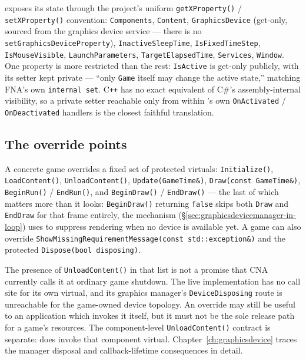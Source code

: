  exposes its state through the project's uniform
\texttt{getXProperty()} / \texttt{setXProperty()} convention: \texttt{Components},
\texttt{Content}, \texttt{GraphicsDevice} (get-only, sourced from the graphics device
service --- there is no \texttt{setGraphicsDeviceProperty}), \texttt{InactiveSleepTime},
\texttt{IsFixedTimeStep}, \texttt{IsMouseVisible}, \texttt{LaunchParameters},
\texttt{TargetElapsedTime}, \texttt{Services}, \texttt{Window}. One property is more
restricted than the rest: \texttt{IsActive} is get-only publicly, with its setter kept
private --- ``only \texttt{Game} itself may change the active state,'' matching FNA's own
\texttt{internal set}. C\texttt{++} has no exact equivalent of C\#'s assembly-internal
visibility, so a private setter reachable only from within 's own
\texttt{OnActivated} / \texttt{OnDeactivated} handlers is the closest faithful translation.

\subsection{The override points}

A concrete game overrides a fixed set of protected virtuals: \texttt{Initialize()},
\texttt{LoadContent()}, \texttt{UnloadContent()}, \texttt{Update(GameTime\&)},
\texttt{Draw(const GameTime\&)}, \texttt{BeginRun()} / \texttt{EndRun()}, and
\texttt{BeginDraw()} / \texttt{EndDraw()} --- the last of which matters more than it looks:
\texttt{BeginDraw()} returning \texttt{false} skips both \texttt{Draw} and \texttt{EndDraw}
for that frame entirely, the mechanism 
(\S\ref{sec:graphicsdevicemanager-in-loop}) uses to suppress rendering when no device is
available yet. A game can also override \texttt{ShowMissingRequirementMessage(const
std::exception\&)} and the protected \texttt{Dispose(bool disposing)}.

The presence of \texttt{UnloadContent()} in that list is not a promise that CNA currently calls
it at ordinary game shutdown. The live  implementation has no call site for its
own virtual, and its graphics manager's \texttt{DeviceDisposing} route is unreachable for the
game-owned device topology. An override may still be useful to an application which invokes it
itself, but it must not be the sole release path for a game's resources. The component-level
\texttt{UnloadContent()} contract is separate: 
does invoke that component virtual. Chapter~\ref{ch:graphicsdevice} traces the manager disposal
and callback-lifetime consequences in detail.

